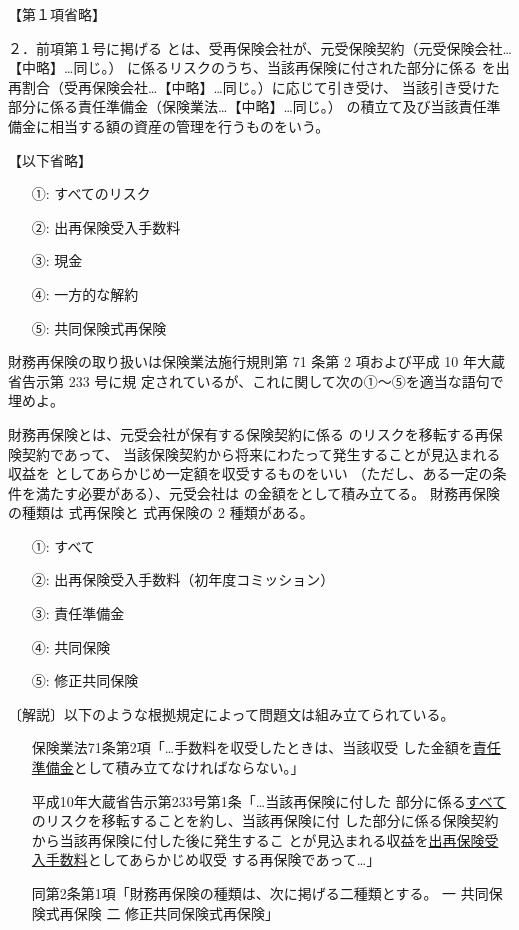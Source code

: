 \documentclass[report,gutter=10mm,fore-edge=10mm,uplatex,dvipdfmx]{jlreq}
\begin{document}
【第１項省略】

２．前項第１号に掲げる
とは、受再保険会社が、元受保険契約（元受保険会社…【中略】…同じ。）
に係るリスクのうち、当該再保険に付された部分に係る
を出再割合（受再保険会社…【中略】…同じ。）に応じて引き受け、
当該引き受けた部分に係る責任準備金（保険業法…【中略】…同じ。）
の積立て及び当該責任準備金に相当する額の資産の管理を行うものをいう。

【以下省略】

\answer{}
\begin{itemize}
\item[ ①: ] すべてのリスク
\item[ ②: ] 出再保険受入手数料
\item[ ③: ] 現金
\item[ ④: ] 一方的な解約
\item[ ⑤: ] 共同保険式再保険
\end{itemize}

財務再保険の取り扱いは保険業法施行規則第 71 条第 2 項および平成 10 年大蔵省告示第 233 号に規
定されているが、これに関して次の①～⑤を適当な語句で埋めよ。

財務再保険とは、元受会社が保有する保険契約に係る
のリスクを移転する再保険契約であって、
当該保険契約から将来にわたって発生することが見込まれる収益を
としてあらかじめ一定額を収受するものをいい
（ただし、ある一定の条件を満たす必要がある）、元受会社は
の金額をとして積み立てる。
財務再保険の種類は
式再保険と
式再保険の 2 種類がある。

\answer{}
\begin{itemize}
\item[ ①: ] すべて
\item[ ②: ] 出再保険受入手数料（初年度コミッション）
\item[ ③: ] 責任準備金
\item[ ④: ] 共同保険
\item[ ⑤: ] 修正共同保険
\end{itemize}

〔解説〕以下のような根拠規定によって問題文は組み立てられている。
\begin{itemize}
\item[] 保険業法71条第2項「…手数料を収受したときは、当該収受
 した金額を\underline{責任準備金}として積み立てなければならない。」
\item[] 平成10年大蔵省告示第233号第1条「…当該再保険に付した
 部分に係る\underline{すべて}のリスクを移転することを約し、当該再保険に付
 した部分に係る保険契約から当該再保険に付した後に発生するこ
 とが見込まれる収益を\underline{出再保険受入手数料}としてあらかじめ収受
 する再保険であって…」
\item[] 同第2条第1項「財務再保険の種類は、次に掲げる二種類とする。
 一 共同保険式再保険  二 修正共同保険式再保険」
\end{itemize}
\end{document}

